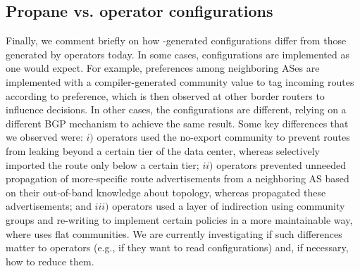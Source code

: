 \subsection{Propane vs. operator configurations}

Finally, we comment briefly on how \sysname-generated configurations differ from those generated by operators today. 
%
In some cases, \sysname configurations are implemented as one would expect. For example, preferences among neighboring ASes are implemented with a compiler-generated community value to tag incoming routes according to preference, which is then observed at other border routers to influence decisions. In other cases, the \sysname configurations are different, relying on a different BGP mechanism to achieve the same result. Some key differences that we observed were: 
%
$i)$ operators used the no-export community to prevent routes from leaking beyond a certain tier of the data center, whereas \sysname selectively imported the route only below a certain tier; 
%
$ii)$ operators prevented unneeded propagation of more-specific route advertisements from a neighboring AS based on their out-of-band knowledge about topology, whereas \sysname propagated these advertisements; and
%
$iii)$ operators used a layer of indirection using community groups and re-writing to implement certain policies in a more maintainable way, where \sysname uses flat communities. We are currently investigating if such differences matter to operators (e.g., if they want to read \sysname configurations) and, if necessary, how to reduce them.
